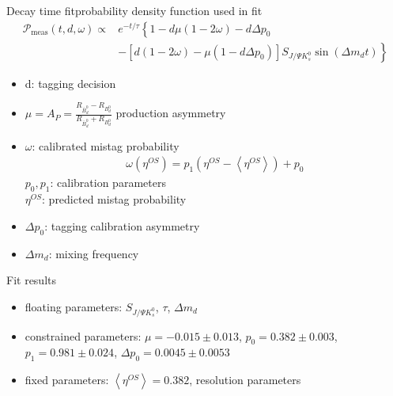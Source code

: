 \documentclass{beamer}
\newcommand{\SJPsi}{S_{J/\Psi K_s^0}}
\begin{document}
	
	\begin{frame}{Decay time fit}{probability density function used in fit}
	\begin{align}
\nonumber\mathcal{P}_{\text{meas}}(t, d, \omega) \propto &e^{-t/\tau} \left\lbrace 1-d\mu(1-2\omega)-d\Delta p_0 \right. \\
&- \left.\left[d(1-2\omega)-\mu(1-d\Delta p_0)\right]\SJPsi\sin(\Delta m_d t)\right\rbrace
	\end{align}	
	\begin{itemize}
		\item d: tagging decision
		\item $\mu = A_P = \frac{R_{\bar{B}_d^0}-R_{B_d^0}}{R_{\bar{B}_d^0}+R_{B_d^0}}$ production asymmetry
		\item $\omega$: calibrated mistag probability
		      \begin{align}
		      \omega(\eta^{OS}) = p_1 (\eta^{OS} - \left\langle \eta^{OS} \right\rangle) + p_0
		      \end{align}
		      $p_0, p_1$: calibration parameters \\
		      $\eta^{OS}$: predicted mistag probability
		\item $\Delta p_0$: tagging calibration asymmetry
		\item $\Delta m_d$: mixing frequency

	\end{itemize}	
	\end{frame}
	
	
	\begin{frame}{Fit results}
	\begin{itemize}
		\item floating parameters: $S_{J/\Psi K_s^0}$, $\tau$, $\Delta m_d$
		\item constrained parameters: $\mu = -0.015\pm0.013$, $p_0 = 0.382\pm0.003$, $p_1=0.981\pm0.024$, $\Delta p_0 = 0.0045\pm0.0053$
		\item fixed parameters: $\left\langle \eta^{OS} \right\rangle = 0.382$, resolution parameters
	\end{itemize}
	\end{frame}
\end{document}
